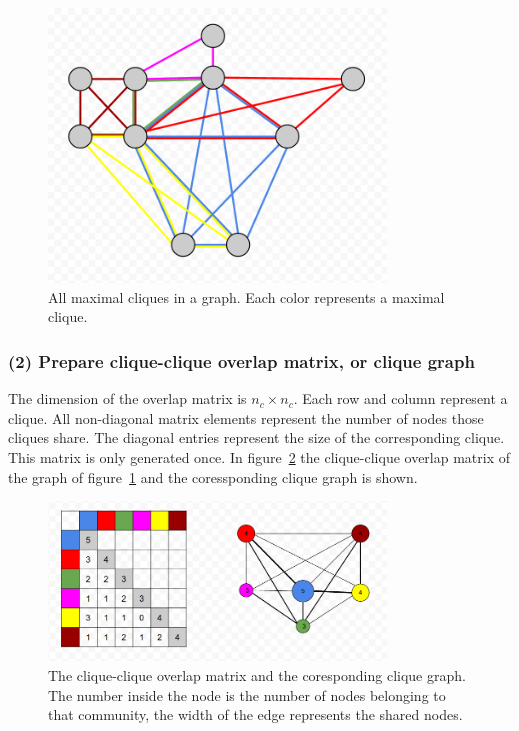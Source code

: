 \documentclass[runningheads,a4paper]{llncs}
\begin{document}
\begin{figure}
\begin{center}
	\includegraphics[width=0.8\textwidth]{allmaxcliques.png}
		\caption{All maximal cliques in a graph. Each color represents a maximal clique.}
		\label{fig:allmaxcliques}
\end{center}
\end{figure}

\subsubsection{(2) Prepare clique-clique overlap matrix, or clique graph}
The dimension of the overlap matrix is $n_c \times n_c$. Each row and column represent a clique.
All non-diagonal matrix elements represent the number of nodes those cliques share.
The diagonal entries represent the size of the corresponding clique.
This matrix is only generated once.
In figure~\ref{fig:matrix} the clique-clique overlap matrix of the graph of figure~\ref{fig:allmaxcliques} and the coressponding clique graph is shown.

\begin{figure}
\begin{center}
	\includegraphics[width=0.8\textwidth]{matrix.png}
		\caption{The clique-clique overlap matrix and the coresponding clique graph. The number inside the node is the number of nodes belonging to that community, the width of the edge represents the shared nodes.}
		\label{fig:matrix}
\end{center}		
\end{figure}
\end{document}
